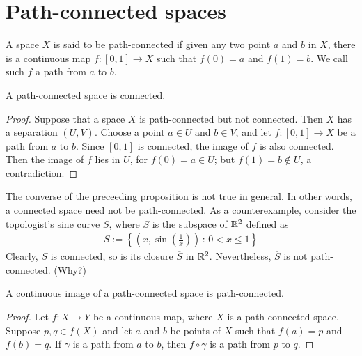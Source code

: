 \section{Path-connected spaces}

\begin{defi}
    A space $X$ is said to be path-connected if given any two point $a$ and $b$ in $X$, there is a continuous map $f: [0, 1]\rightarrow X$ such that $f(0)=a$ and $f(1)=b$.
    We call such $f$ a path from $a$ to $b$.
\end{defi}

\begin{prop}
    A path-connected space is connected.
\end{prop}
\begin{proof}
    Suppose that a space $X$ is path-connected but not connected.
    Then $X$ has a separation $(U, V)$.
    Choose a point $a\in U$ and $b\in V$, and let $f: [0, 1]\rightarrow X$ be a path from $a$ to $b$.
    Since $[0, 1]$ is connected, the image of $f$ is also connected.
    Then the image of $f$ lies in $U$, for $f(0)=a\in U$; but $f(1)=b\notin U$, a contradiction.
\end{proof}
\begin{rmk}
    The converse of the preceeding proposition is not true in general.
    In other words, a connected space need not be path-connected.
    As a counterexample, consider the topologist's sine curve $\overline{S}$, where $S$ is the subspace of ${\mathbb{R}}^2$ defined as
    \begin{align*}
        S:=\left\{
            \left(x, \sin\left(\frac{1}{x}\right)\right)
            \,:\,
            0<x\leq 1
            \right\}
    \end{align*}
    Clearly, $S$ is connected, so is its closure $\overline{S}$ in ${\mathbb{R}}^2$.
    Nevertheless, $\overline{S}$ is not path-connected. \color{brown}(Why?)\color{black}
\end{rmk}

\begin{prop}
    A continuous image of a path-connected space is path-connected.
\end{prop}
\begin{proof}
    Let $f: X\rightarrow Y$ be a continuous map, where $X$ is a path-connected space.
    Suppose $p, q\in f(X)$ and let $a$ and $b$ be points of $X$ such that $f(a)=p$ and $f(b)=q$.
    If $\gamma$ is a path from $a$ to $b$, then $f\circ\gamma$ is a path from $p$ to $q$.
\end{proof}

